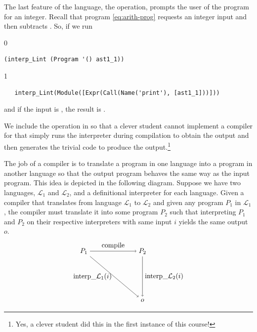 \documentclass[7x10]{TimesAPriori_MIT}%
\def\racketEd{0}
\def\pythonEd{1}
\def\edition{1}
\newcommand{\pythonColor}[0]{}
\numberwithin{theorem}{chapter}
\numberwithin{definition}{chapter}
\numberwithin{equation}{chapter}
\begin{document}


The last feature of the \LangInt{} language, the \READOP{} operation,
prompts the user of the program for an integer.  Recall that program
\eqref{eq:arith-prog} requests an integer input and then subtracts
. So, if we run {\if\edition\racketEd
\begin{lstlisting}
(interp_Lint (Program '() ast1_1))
\end{lstlisting}
\fi}
{\if\edition\pythonEd\pythonColor
\begin{lstlisting}
   interp_Lint(Module([Expr(Call(Name('print'), [ast1_1]))]))
\end{lstlisting}
\fi}
\noindent and if the input is , the result is .

We include the \READOP{} operation in \LangInt{} so that a clever
student cannot implement a compiler for \LangInt{} that simply runs
the interpreter during compilation to obtain the output and then
generates the trivial code to produce the output.\footnote{Yes, a
  clever student did this in the first instance of this course!}

The job of a compiler is to translate a program in one language into a
program in another language so that the output program behaves the
same way as the input program. This idea is depicted in the
following diagram. Suppose we have two languages, $\mathcal{L}_1$ and
$\mathcal{L}_2$, and a definitional interpreter for each language.
Given a compiler that translates from language $\mathcal{L}_1$ to
$\mathcal{L}_2$ and given any program $P_1$ in $\mathcal{L}_1$, the
compiler must translate it into some program $P_2$ such that
interpreting $P_1$ and $P_2$ on their respective interpreters with
same input $i$ yields the same output $o$.
\begin{equation} \label{eq:compile-correct}
\begin{tikzpicture}[baseline=(current  bounding  box.center)]
 \node (p1) at (0,  0) {$P_1$};
 \node (p2) at (3,  0) {$P_2$};
 \node (o)  at (3, -2.5) {$o$};

 \path[->] (p1) edge [above] node {compile} (p2);
 \path[->] (p2) edge [right] node {interp\_$\mathcal{L}_2$($i$)} (o);
 \path[->] (p1) edge [left]  node {interp\_$\mathcal{L}_1$($i$)} (o);
\end{tikzpicture}
\end{equation}
\end{document}
